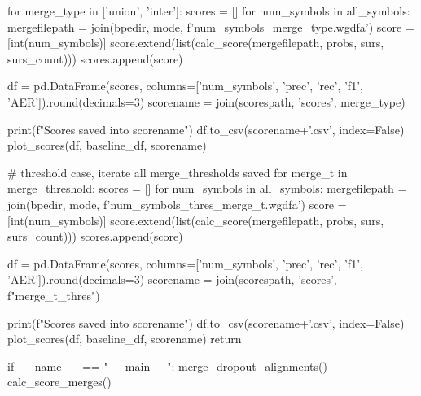 \begin{python}
  for merge_type in ['union', 'inter']:
    scores = []
    for num_symbols in all_symbols:
      mergefilepath = join(bpedir, mode, f'{num_symbols}_{merge_type}.wgdfa')
      score = [int(num_symbols)]
      score.extend(list(calc_score(mergefilepath, probs, surs, surs_count)))
      scores.append(score)

    df = pd.DataFrame(scores, columns=['num_symbols', 'prec', 'rec', 'f1', 'AER']).round(decimals=3)
    scorename = join(scorespath, 'scores', merge_type)

    print(f"Scores saved into {scorename}")
    df.to_csv(scorename+'.csv', index=False)
    plot_scores(df, baseline_df, scorename)

  # threshold case, iterate all merge_thresholds saved
  for merge_t in merge_threshold:
    scores = []
    for num_symbols in all_symbols:
      mergefilepath = join(bpedir, mode, f'{num_symbols}_thres_{merge_t}.wgdfa')
      score = [int(num_symbols)]
      score.extend(list(calc_score(mergefilepath, probs, surs, surs_count)))
      scores.append(score)

    df = pd.DataFrame(scores, columns=['num_symbols', 'prec', 'rec', 'f1', 'AER']).round(decimals=3)
    scorename = join(scorespath, 'scores', f"{merge_t}_thres")
    
    print(f"Scores saved into {scorename}")
    df.to_csv(scorename+'.csv', index=False)
    plot_scores(df, baseline_df, scorename)
  return

if __name__ == "__main__":
    merge_dropout_alignments()
    calc_score_merges()
\end{python}


\begin{python}

\end{python}
